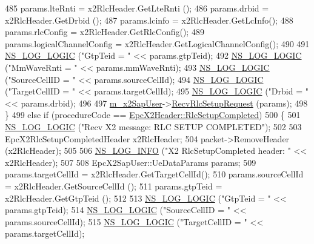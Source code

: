 \begin{DoxyCode}
485       params.lteRnti = x2RlcHeader.GetLteRnti ();
486       params.drbid = x2RlcHeader.GetDrbid ();
487       params.lcinfo = x2RlcHeader.GetLcInfo();
488       params.rlcConfig = x2RlcHeader.GetRlcConfig();
489       params.logicalChannelConfig = x2RlcHeader.GetLogicalChannelConfig();
490 
491       \hyperlink{group__logging_ga88acd260151caf2db9c0fc84997f45ce}{NS\_LOG\_LOGIC} (\textcolor{stringliteral}{"GtpTeid = "} << params.gtpTeid);
492       \hyperlink{group__logging_ga88acd260151caf2db9c0fc84997f45ce}{NS\_LOG\_LOGIC} (\textcolor{stringliteral}{"MmWaveRnti = "} << params.mmWaveRnti);
493       \hyperlink{group__logging_ga88acd260151caf2db9c0fc84997f45ce}{NS\_LOG\_LOGIC} (\textcolor{stringliteral}{"SourceCellID = "} << params.sourceCellId);
494       \hyperlink{group__logging_ga88acd260151caf2db9c0fc84997f45ce}{NS\_LOG\_LOGIC} (\textcolor{stringliteral}{"TargetCellID = "} << params.targetCellId);
495       \hyperlink{group__logging_ga88acd260151caf2db9c0fc84997f45ce}{NS\_LOG\_LOGIC} (\textcolor{stringliteral}{"Drbid = "} << params.drbid);
496 
497       \hyperlink{classns3_1_1EpcX2_a0a74a3c19067fe18af3021c7b4c24c19}{m\_x2SapUser}->\hyperlink{classns3_1_1EpcX2SapUser_af982d60c31e400c220777b2930470474}{RecvRlcSetupRequest} (params);
498     \}
499   \textcolor{keywordflow}{else} \textcolor{keywordflow}{if} (procedureCode == \hyperlink{classns3_1_1EpcX2Header_afd178c1ed3c47948c587955698a15b0da8a3e97ca98e6cf28f14010bb1e9306cb}{EpcX2Header::RlcSetupCompleted})
500     \{
501       \hyperlink{group__logging_ga88acd260151caf2db9c0fc84997f45ce}{NS\_LOG\_LOGIC} (\textcolor{stringliteral}{"Recv X2 message: RLC SETUP COMPLETED"});
502 
503       EpcX2RlcSetupCompletedHeader x2RlcHeader;
504       packet->RemoveHeader (x2RlcHeader);
505 
506       \hyperlink{group__logging_gafbd73ee2cf9f26b319f49086d8e860fb}{NS\_LOG\_INFO} (\textcolor{stringliteral}{"X2 RlcSetupCompleted header: "} << x2RlcHeader);
507 
508       EpcX2SapUser::UeDataParams params;
509       params.targetCellId = x2RlcHeader.GetTargetCellId();
510       params.sourceCellId = x2RlcHeader.GetSourceCellId ();
511       params.gtpTeid = x2RlcHeader.GetGtpTeid ();
512 
513       \hyperlink{group__logging_ga88acd260151caf2db9c0fc84997f45ce}{NS\_LOG\_LOGIC} (\textcolor{stringliteral}{"GtpTeid = "} << params.gtpTeid);
514       \hyperlink{group__logging_ga88acd260151caf2db9c0fc84997f45ce}{NS\_LOG\_LOGIC} (\textcolor{stringliteral}{"SourceCellID = "} << params.sourceCellId);
515       \hyperlink{group__logging_ga88acd260151caf2db9c0fc84997f45ce}{NS\_LOG\_LOGIC} (\textcolor{stringliteral}{"TargetCellID = "} << params.targetCellId);

\end{DoxyCode}

